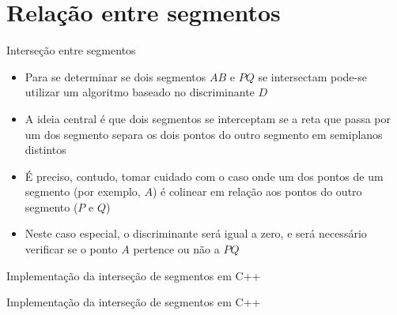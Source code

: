 \section{Relação entre segmentos}

\begin{frame}[fragile]{Interseção entre segmentos}

    \begin{itemize}
        \item Para se determinar se dois segmentos $AB$ e $PQ$ se intersectam pode-se utilizar um 
            algoritmo baseado no discriminante $D$

        \item A ideia central é que dois segmentos se interceptam se a reta que passa por um 
            dos segmento separa os dois pontos do outro segmento em semiplanos distintos

        \item É preciso, contudo, tomar cuidado com o caso onde um dos pontos de um segmento 
            (por exemplo, $A$) é colinear em relação aos pontos do outro segmento ($P$ e $Q$)

        \item Neste caso especial, o discriminante será igual a zero, e será necessário verificar
            se o ponto $A$ pertence ou não a $PQ$
    \end{itemize}

\end{frame}

\begin{frame}[fragile]{Implementação da interseção de segmentos em C++}
\end{frame}

\begin{frame}[fragile]{Implementação da interseção de segmentos em C++}
\end{frame}
